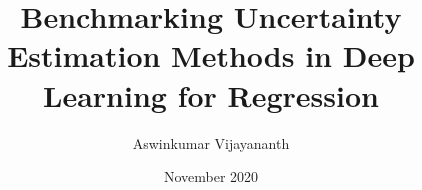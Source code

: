 \documentclass[rnd]{mas_report}
\author{Aswinkumar Vijayananth}
\title{Benchmarking Uncertainty Estimation Methods in Deep Learning for Regression}
\date{November 2020}
\begin{document}
\frontmatter

\begin{titlepage}
    \maketitle
\end{titlepage}

\cleardoublepage
{}

\pagestyle{plain}
\cleardoublepage
\statementpage




\tableofcontents
\listoftables

\mainmatter %

\pagestyle{mainmatter}




%

%


\begin{appendices}
    
\end{appendices}

\backmatter


\nocite{*}
\end{document}
